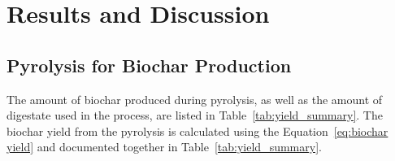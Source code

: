 \newpage
\section{Results and Discussion}
\label{Section:result}



\subsection{Pyrolysis for Biochar Production}
\label{subsec:results-pyrolysis}


The amount of biochar produced during pyrolysis, as well as the amount of digestate used in the process, are listed in Table~\ref{tab:yield_summary}. The biochar yield from the pyrolysis is calculated using the Equation~\ref{eq:biochar yield} and documented together in Table~\ref{tab:yield_summary}. 

